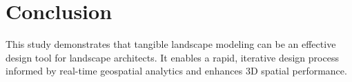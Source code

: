\documentclass[Afour,sagev,times]{sagej} %
\begin{document}



\section{Conclusion}

This study demonstrates that tangible landscape modeling
can be an effective design tool for landscape architects.
It enables a rapid, iterative design process 
informed by real-time geospatial analytics and 
enhances 3D spatial performance.


%




\end{document}
